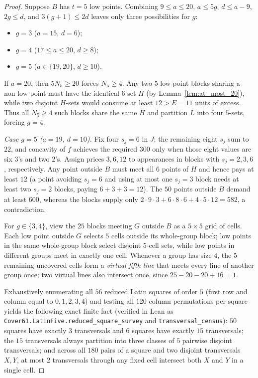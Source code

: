 \documentclass[11pt,a4paper]{article}
\theoremstyle{definition}
\theoremstyle{remark}
\begin{document}
\begin{proof}
Suppose $B$ has $t = 5$ low points. Combining $9 \le a \le 20$, $a \le 5g$, $d \le a - 9$, $2g \le d$, and $3(g+1) \le 2d$ leaves only three possibilities for $g$:
\begin{itemize}
  \item $g = 3$ ($a = 15$, $d = 6$);
  \item $g = 4$ ($17 \le a \le 20$, $d \ge 8$);
  \item $g = 5$ ($a \in \{19,20\}$, $d \ge 10$).
\end{itemize}
If $a = 20$, then $5N_5 \ge 20$ forces $N_5 \ge 4$. Any two $5$-low-point blocks sharing a non-low point must have the identical $6$-set $H$ (by Lemma~\ref{lem:at_most_20}), while two disjoint $H$-sets would consume at least $12 > E = 11$ units of excess. Thus all $N_5 \ge 4$ such blocks share the same $H$ and partition $L$ into four $5$-sets, forcing $g = 4$.

\emph{Case $g = 5$ ($a = 19$, $d = 10$).} Fix four $s_j = 6$ in $J$; the remaining eight $s_j$ sum to $22$, and concavity of $f$ achieves the required $300$ only when those eight values are six $3$'s and two $2$'s. Assign prices $3, 6, 12$ to appearances in blocks with $s_j = 2, 3, 6$, respectively. Any point outside $B$ must meet all $6$ points of $H$ and hence pays at least $12$ (a point avoiding $s_j = 6$ and using at most one $s_j = 3$ block needs at least two $s_j = 2$ blocks, paying $6 + 3 + 3 = 12$). The $50$ points outside $B$ demand at least $600$, whereas the blocks supply only $2 \cdot 9 \cdot 3 + 6 \cdot 8 \cdot 6 + 4 \cdot 5 \cdot 12 = 582$, a contradiction.

For $g \in \{3,4\}$, view the $25$ blocks meeting $G$ outside $B$ as a $5 \times 5$ grid of cells. Each low point outside $G$ selects $5$ cells outside its whole-group block; low points in the same whole-group block select disjoint $5$-cell sets, while low points in different groups meet in exactly one cell. Whenever a group has size $4$, the $5$ remaining uncovered cells form a \emph{virtual fifth line} that meets every line of another group once; two virtual lines also intersect once, since $25 - 20 - 20 + 16 = 1$.

Exhaustively enumerating all $56$ reduced Latin squares of order $5$ (first row and column equal to $0,1,2,3,4$) and testing all $120$ column permutations per square yields the following exact finite fact (verified in Lean as \texttt{Cover61.LatinFive.reduced\_square\_survey} and \texttt{transversal\_census}): $50$ squares have exactly $3$ transversals and $6$ squares have exactly $15$ transversals; the $15$ transversals always partition into three classes of $5$ pairwise disjoint transversals; and across all $180$ pairs of a square and two disjoint transversals $X, Y$, at most $2$ transversals through any fixed cell intersect both $X$ and $Y$ in a single cell.


\end{proof}
\end{document}
